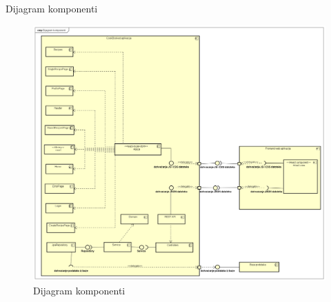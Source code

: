 		\noindent Dijagram komponenti
			
			\begin{figure}[H]
				\centering
				\includegraphics[width=1\textwidth]{slike/dijagrami/Dijagram komponenti.png}
				\caption{Dijagram komponenti}
				\label{fig:enter-label}
			\end{figure}